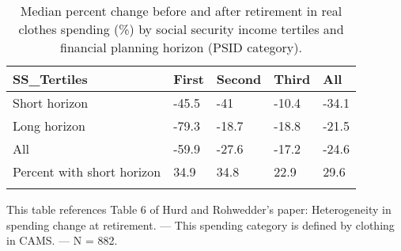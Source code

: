 \begin{table}[tbp] \centering
{}

\caption{Median percent change before and after retirement in real clothes spending (\%) by social security income tertiles and financial planning horizon (PSID category).}
\begin{tabularx}{\textwidth}{lCCCC}

\toprule
{SS\_Tertiles}&{First}&{Second}&{Third}&{All} \tabularnewline
\midrule\addlinespace[1.5ex]
Short horizon&-45.5&-41&-10.4&-34.1 \tabularnewline
Long horizon&-79.3&-18.7&-18.8&-21.5 \tabularnewline
All&-59.9&-27.6&-17.2&-24.6 \tabularnewline
Percent with short horizon&34.9&34.8&22.9&29.6 \tabularnewline
\bottomrule \addlinespace[1.5ex]

\end{tabularx}
\begin{flushleft}
\footnotesize This table references Table 6 of Hurd and Rohwedder's paper: Heterogeneity in spending change at retirement. \linebreak --- \linebreak This spending category is defined by clothing in CAMS. \linebreak --- \linebreak N = 882.
\end{flushleft}
\end{table}
